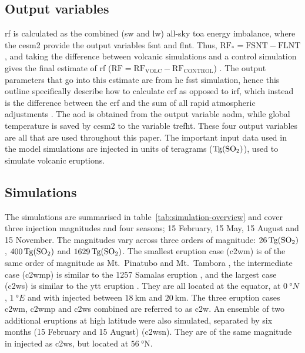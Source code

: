 \documentclass{ametsocV6.1}
\newcommand{\iso}[1][i]{{#1}njected \ce{SO2}}
\begin{document}
\subsection{Output variables}

\gls{rf} is calculated as the combined (\gls{sw} and \gls{lw}) all-sky \gls{toa} energy
imbalance, where the \gls{cesm2} provide the output variables \gls{fsnt} and \gls{flnt}.
Thus, \(\mathrm{RF_*}= \mathrm{FSNT} - \mathrm{FLNT}\), and taking the difference
between volcanic simulations and a control simulation gives the final estimate of
\gls{rf} (\(\mathrm{RF}=\mathrm{RF_{VOLC}}-\mathrm{RF_{CONTROL}}\))
\citep{marshall2020}. The output parameters that go into this estimate are from he
\gls{fsst} simulation, hence this outline specifically describe how to calculate
\gls{erf} as opposed to \gls{irf}, which instead is the difference between the \gls{erf}
and the sum of all rapid atmospheric adjustments \citep{marshall2020,smith2018}. The
\gls{aod} is obtained from the output variable \gls{aodm}, while global temperature is
saved by \gls{cesm2} to the variable \gls{trefht}. These four output variables are all
that are used throughout this paper. The important input data used in the model
simulations are \iso{} in units of teragrams (\(\si{\tera\gram(\ce{SO2})}\)), used to
simulate volcanic eruptions.

\subsection{Simulations}

The simulations are summarised in table~\ref{tab:simulation-overview} and cover three
 injection magnitudes and four seasons; 15 February, 15 May, 15 August and 15
November. The magnitudes vary across three orders of magnitude:
\(\SI{26}{\tera\gram(\ce{SO2})}\), \(\SI{400}{\tera\gram(\ce{SO2})}\) and
\(\SI{1629}{\tera\gram(\ce{SO2})}\). The smallest eruption case (\gls{c2wm}) is of the
same order of magnitude as Mt.\ Pinatubo
\citep[\(\sim10\)--\(\SI{20}{\tera\gram(\ce{SO2})}\);~e.g.][]{timmreck2018} and Mt.\
Tambora \citep[\(\sim\SI{56.2}{\tera\gram(\ce{SO2})}\);~e.g.][]{zanchettin2016}, the
intermediate case (\gls{c2wmp}) is similar to the 1257 Samalas eruption
\citep[\(\sim{118.8}\)--\(\SI{173.1}{\tera\gram(\ce{SO2})}\);~e.g.][]{toohey2017,ottobliesner2016},
and the largest case (\gls{c2ws}) is similar to the \gls{ytt} eruption
\citep[\(100\)--\(\SI{10000}{\tera\gram()}\);~e.g.][]{jones2005}. They are all
located at the equator, at \(\SI{0}{\degree N}\), \(\SI{1}{\degree E}\) and with
\ce{SO2} injected between \(\SI{18}{\kilo\meter}\) and \(\SI{20}{\kilo\meter}\). The
three eruption cases \gls{c2wm}, \gls{c2wmp} and \gls{c2ws} combined are referred to as
\gls{c2w}. An ensemble of two additional eruptions at high latitude were also simulated,
separated by six months (15 February and 15 August) (\gls{c2wsn}). They are of the same
magnitude in \iso{} as \gls{c2ws}, but located at \(\SI{56}{\degree \mathrm{N}}\).
\end{document}
